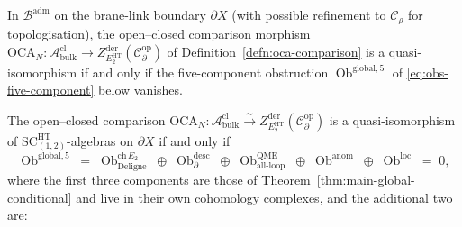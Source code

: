 \begin{thm}
\label{thm:typed-global-mixed-ht-deligne}
In $\mathcal B^{\mathrm{adm}}$ on the brane-link boundary $\partial X$
(with possible refinement to $\mathcal C_\rho$ for topologisation), the
open--closed comparison morphism
$\mathrm{OCA}_N\colon\mathcal A^{\mathrm{cl}}_{\mathrm{bulk}}\to
Z^{\mathrm{der}}_{E_2^{\mathrm{HT}}}(\mathcal C^{\mathrm{op}}_\partial)$
of Definition~\ref{defn:oca-comparison} is a quasi-isomorphism if and
only if the five-component obstruction
$\operatorname{Ob}^{\mathrm{global,5}}$ of
\eqref{eq:obs-five-component} below vanishes.

The open--closed comparison
\(\mathrm{OCA}_N\colon\mathcal A^{\mathrm{cl}}_{\mathrm{bulk}}
\xrightarrow{\sim}Z^{\mathrm{der}}_{E_2^{\mathrm{HT}}}(
\mathcal C^{\mathrm{op}}_\partial)\) is a quasi-isomorphism of
\(\mathrm{SC}^{\mathrm{HT}}_{(1,2)}\)-algebras on \(\partial X\) if and
only if
\begin{equation}\label{eq:obs-five-component}
  \operatorname{Ob}^{\mathrm{global,5}}
   \;=\;
   \operatorname{Ob}^{\mathrm{ch}\,E_2}_{\mathrm{Deligne}}
   \;\oplus\;
   \operatorname{Ob}^{\mathrm{desc}}_{\partial}
   \;\oplus\;
   \operatorname{Ob}^{\mathrm{QME}}_{\mathrm{all\mbox{-}loop}}
   \;\oplus\;
   \operatorname{Ob}^{\mathrm{anom}}
   \;\oplus\;
   \operatorname{Ob}^{\mathrm{loc}}
   \;=\;0,
\end{equation}
where the first three components are those of
Theorem~\ref{thm:main-global-conditional} and live in their own
cohomology complexes, and the additional two are:
\end{thm}
